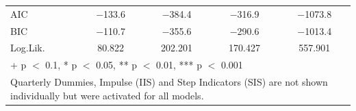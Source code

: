 \begin{table}
{\begin{tabular}[t]{lcccc}
AIC & \num{-133.6} & \num{-384.4} & \num{-316.9} & \num{-1073.8}\\
BIC & \num{-110.7} & \num{-355.6} & \num{-290.6} & \num{-1013.4}\\
Log.Lik. & \num{80.822} & \num{202.201} & \num{170.427} & \num{557.901}\\
\bottomrule
\multicolumn{5}{l}{\rule{0pt}{1em}+ p $<$ 0.1, * p $<$ 0.05, ** p $<$ 0.01, *** p $<$ 0.001}\\
\multicolumn{5}{l}{\rule{0pt}{1em}Quarterly Dummies, Impulse (IIS) and Step Indicators (SIS) are not shown individually but were activated for all models.}\\
\end{tabular}}
\end{table}

